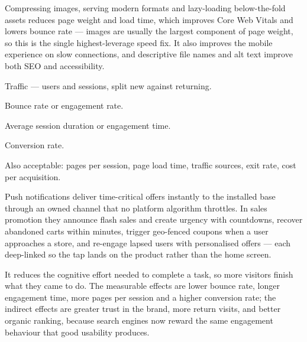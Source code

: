 \begin{qlist}
Compressing images, serving modern formats and lazy-loading below-the-fold
assets reduces page weight and load time, which improves Core Web Vitals and
lowers bounce rate --- images are usually the largest component of page weight,
so this is the single highest-leverage speed fix. It also improves the mobile
experience on slow connections, and descriptive file names and alt text improve
both SEO and accessibility.

\begin{apts}
\item Traffic --- users and sessions, split new against returning.
\item Bounce rate or engagement rate.
\item Average session duration or engagement time.
\item Conversion rate.
\end{apts}
Also acceptable: pages per session, page load time, traffic sources, exit rate,
cost per acquisition.

Push notifications deliver time-critical offers instantly to the installed base
through an owned channel that no platform algorithm throttles. In sales
promotion they announce flash sales and create urgency with countdowns, recover
abandoned carts within minutes, trigger geo-fenced coupons when a user
approaches a store, and re-engage lapsed users with personalised offers --- each
deep-linked so the tap lands on the product rather than the home screen.

It reduces the cognitive effort needed to complete a task, so more visitors
finish what they came to do. The measurable effects are lower bounce rate,
longer engagement time, more pages per session and a higher conversion rate;
the indirect effects are greater trust in the brand, more return visits, and
better organic ranking, because search engines now reward the same engagement
behaviour that good usability produces.


\end{qlist}
